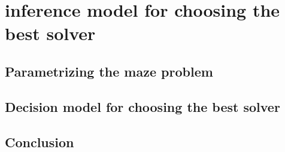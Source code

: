 \chapter{inference model for choosing the best solver}\label{cha:background}
\section{Parametrizing the maze problem}
\section{Decision model for choosing the best solver}
\section{Conclusion}